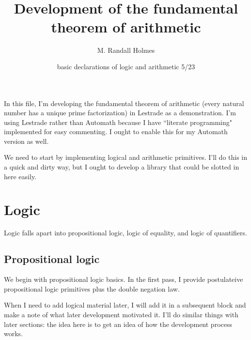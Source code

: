 \documentclass[12pt]{article}
\title{Development of the fundamental theorem of arithmetic}
\author{M. Randall Holmes}
\date{basic declarations of logic and arithmetic 5/23}
\begin{document}
\maketitle

In this file, I'm developing the fundamental theorem of arithmetic (every natural number has a unique prime factorization) in Lestrade as a demonstration.
I'm using Lestrade rather than Automath because I have ``literate programming" implemented for easy commenting.  I ought to enable this for my Automath version as well.

We need to start by implementing logical and arithmetic primitives.  I'll do this in a quick and dirty way, but I ought to develop a library that could be slotted in here easily.

\section{Logic}

Logic falls apart into propositional logic, logic of equality, and logic of quantifiers.

\subsection{Propositional logic}

We begin with propositional logic basics.  In the first pass, I provide postulateive propositional logic primitives plus the double negation law.

When I need to add logical material later, I will add it in a subsequent block and make a note of what later development motivated it.  I'll do similar things with later sections:  the idea here is to get an idea of how the development process works.
\end{document}

